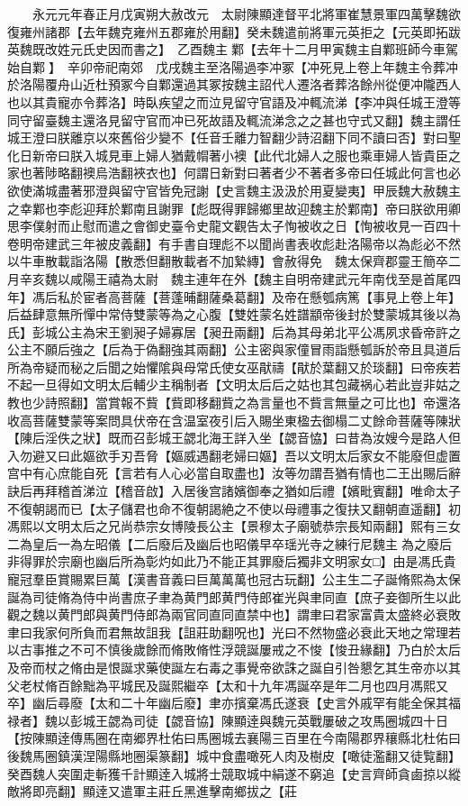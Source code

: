 　　永元元年春正月戊寅朔大赦改元　太尉陳顯達督平北將軍崔慧景軍四萬擊魏欲復雍州諸郡【去年魏克雍州五郡雍於用翻】癸未魏遣前將軍元英拒之【元英即拓跋英魏既改姓元氏史因而書之】　乙酉魏主鄴【去年十二月甲寅魏主自鄴班師今車駕始自鄴】　辛卯帝祀南郊　戊戌魏主至洛陽過李冲冢【冲死見上卷上年魏主令葬冲於洛陽覆舟山近杜預冢今自鄴還過其冢按魏主詔代人遷洛者葬洛餘州從便冲隴西人也以其貴寵亦令葬洛】時臥疾望之而泣見留守官語及冲輒流涕【李冲與任城王澄等同守留臺魏主還洛見留守官而冲已死故語及輒流涕念之之甚也守式又翻】魏主謂任城王澄曰朕離京以來舊俗少變不【任音壬離力智翻少詩沼翻下同不讀曰否】對曰聖化日新帝曰朕入城見車上婦人猶戴㡌著小襖【此代北婦人之服也乘車婦人皆貴臣之家也著陟略翻襖烏浩翻裌衣也】何謂日新對曰著者少不著者多帝曰任城此何言也必欲使滿城盡著邪澄與留守官皆免冠謝【史言魏主汲汲於用夏變夷】甲辰魏大赦魏主之幸鄴也李彪迎拜於鄴南且謝罪【彪既得罪歸鄉里故迎魏主於鄴南】帝曰朕欲用卿思李僕射而止慰而遣之會御史臺令史龍文觀告太子恂被收之日【恂被收見一百四十卷明帝建武三年被皮義翻】有手書自理彪不以聞尚書表收彪赴洛陽帝以為彪必不然以牛車散載詣洛陽【散悉但翻散載者不加縶縳】會赦得免　魏太保齊郡靈王簡卒二月辛亥魏以咸陽王禧為太尉　魏主連年在外【魏主自明帝建武元年南伐至是首尾四年】馮后私於宦者高菩薩【菩蓬晡翻薩桑葛翻】及帝在懸瓠病篤【事見上卷上年】后益肆意無所憚中常侍雙蒙等為之心腹【雙姓蒙名姓譜顓帝後封於雙蒙城其後以為氏】彭城公主為宋王劉昶子婦寡居【昶丑兩翻】后為其母弟北平公馮夙求昏帝許之公主不願后強之【后為于偽翻強其兩翻】公主密與家僮冒雨詣懸瓠訴於帝且具道后所為帝疑而秘之后聞之始懼隂與母常氏使女巫猒禱【猒於葉翻又於琰翻】曰帝疾若不起一旦得如文明太后輔少主稱制者【文明太后后之姑也其包藏祸心若此豈非姑之教也少詩照翻】當賞報不貲【貲即移翻貲之為言量也不貲言無量之可比也】帝還洛收高菩薩雙蒙等案問具伏帝在含温室夜引后入賜坐東楹去御榻二丈餘命菩薩等陳狀【陳后淫佚之狀】既而召彭城王勰北海王詳入坐【勰音恊】曰昔為汝嫂今是路人但入勿避又曰此嫗欲手刃吾脅【嫗威遇翻老婦曰嫗】吾以文明太后家女不能廢但虚置宫中有心庶能自死【言若有人心必當自取盡也】汝等勿謂吾猶有情也二王出賜后辭訣后再拜稽首涕泣【稽音啟】入居後宫諸嬪御奉之猶如后禮【嬪毗賓翻】唯命太子不復朝謁而已【太子儲君也命不復朝謁絶之不使以母禮事之復扶又翻朝直遥翻】初馮熙以文明太后之兄尚恭宗女博陵長公主【景穆太子廟號恭宗長知兩翻】熙有三女二為皇后一為左昭儀【二后廢后及幽后也昭儀早卒瑶光寺之練行尼魏主為之廢后非得罪於宗廟也幽后所為彰灼如此乃不能正其罪廢后獨非文明家女□】由是馮氏貴寵冠羣臣賞賜累巨萬【漢書音義曰巨萬萬萬也冠古玩翻】公主生二子誕脩熙為太保誕為司徒脩為侍中尚書庶子聿為黄門郎黄門侍郎崔光與聿同直【庶子妾御所生以此觀之魏以黄門郎與黄門侍郎為兩官同直同直禁中也】謂聿曰君家富貴太盛終必衰敗聿曰我家何所負而君無故詛我【詛莊助翻呪也】光曰不然物盛必衰此天地之常理若以古事推之不可不慎後歲餘而脩敗脩性浮競誕屢戒之不悛【悛丑緣翻】乃白於太后及帝而杖之脩由是恨誕求藥使誕左右毒之事覺帝欲誅之誕自引咎懇乞其生帝亦以其父老杖脩百餘黜為平城民及誕熙繼卒【太和十九年馮誕卒是年二月也四月馮熙又卒】幽后尋廢【太和二十年幽后廢】聿亦擯棄馮氏遂衰【史言外戚罕有能全保其福禄者】魏以彭城王勰為司徒【勰音協】陳顯逹與魏元英戰屢破之攻馬圈城四十日【按陳顯逹傳馬圈在南郷界杜佑曰馬圈城去襄陽三百里在今南陽郡界穰縣北杜佑曰後魏馬圈鎮漢涅陽縣地圈渠篆翻】城中食盡噉死人肉及樹皮【噉徒濫翻又徒覧翻】癸酉魏人突圍走斬獲千計顯逹入城將士競取城中絹遂不窮追【史言齊師貪鹵掠以縱敵將即亮翻】顯逹又遣軍主莊丘黑進擊南鄉拔之【莊